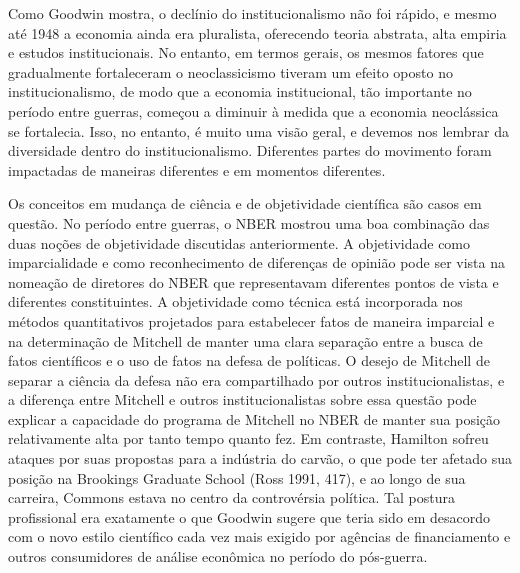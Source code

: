 \documentclass[a4paper,12pt]{article}[abntex2]
\begin{document}
Como Goodwin mostra, o declínio do institucionalismo não foi rápido, e mesmo até 1948 a economia ainda era pluralista, oferecendo teoria abstrata, alta empiria e estudos institucionais. No entanto, em termos gerais, os mesmos fatores que gradualmente fortaleceram o neoclassicismo tiveram um efeito oposto no institucionalismo, de modo que a economia institucional, tão importante no período entre guerras, começou a diminuir à medida que a economia neoclássica se fortalecia. Isso, no entanto, é muito uma visão geral, e devemos nos lembrar da diversidade dentro do institucionalismo. Diferentes partes do movimento foram impactadas de maneiras diferentes e em momentos diferentes.

Os conceitos em mudança de ciência e de objetividade científica são casos em questão. No período entre guerras, o NBER mostrou uma boa combinação das duas noções de objetividade discutidas anteriormente. A objetividade como imparcialidade e como reconhecimento de diferenças de opinião pode ser vista na nomeação de diretores do NBER que representavam diferentes pontos de vista e diferentes constituintes. A objetividade como técnica está incorporada nos métodos quantitativos projetados para estabelecer fatos de maneira imparcial e na determinação de Mitchell de manter uma clara separação entre a busca de fatos científicos e o uso de fatos na defesa de políticas. O desejo de Mitchell de separar a ciência da defesa não era compartilhado por outros institucionalistas, e a diferença entre Mitchell e outros institucionalistas sobre essa questão pode explicar a capacidade do programa de Mitchell no NBER de manter sua posição relativamente alta por tanto tempo quanto fez. Em contraste, Hamilton sofreu ataques por suas propostas para a indústria do carvão, o que pode ter afetado sua posição na Brookings Graduate School (Ross 1991, 417), e ao longo de sua carreira, Commons estava no centro da controvérsia política. Tal postura profissional era exatamente o que Goodwin sugere que teria sido em desacordo com o novo estilo científico cada vez mais exigido por agências de financiamento e outros consumidores de análise econômica no período do pós-guerra.
\end{document}
